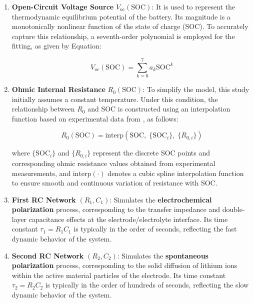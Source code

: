 \begin{enumerate}[label=(\alph*)]
    \item \textbf{Open-Circuit Voltage Source} $V_{\text{oc}}(\text{SOC})$: It is used to represent the thermodynamic equilibrium 
    potential of the battery. Its magnitude is a monotonically nonlinear function of the state of charge (SOC). 
    To accurately capture this relationship, a seventh-order polynomial is employed for the fitting, as given by Equation: 

    \begin{equation}
    V_{oc}(\text{SOC}) = \sum_{k=0}^{7} a_k \text{SOC}^k
    \label{eq:voc}
    \end{equation}
    
    \item \textbf{Ohmic Internal Resistance} $R_0(\text{SOC})$:
    To simplify the model, this study initially assumes a constant temperature.
    Under this condition, the relationship between $R_0$ and SOC is constructed
    using an interpolation function based on experimental data from \cite{Chunling2024},
    as follows:

    \begin{equation}
    R_0(\text{SOC}) = \text{interp}\left(\text{SOC},\; \{\text{SOC}_i\},\; \{R_{0,i}\}\right)
    \label{eq:r0}
    \end{equation}

    where $\{\text{SOC}_i\}$ and $\{R_{0,i}\}$ represent the discrete SOC points and corresponding
    ohmic resistance values obtained from experimental measurements, and $\text{interp}(\cdot)$
    denotes a cubic spline interpolation function to ensure smooth and continuous variation
    of resistance with SOC.

    \item \textbf{First RC Network} $(R_1, C_1)$: Simulates the \textbf{electrochemical polarization} process, 
    corresponding to the transfer impedance and double-layer capacitance effects at the electrode/electrolyte interface. 
    Its time constant $\tau_1 = R_1C_1$ is typically in the order of seconds, reflecting the fast dynamic behavior of the system.
    
    \item \textbf{Second RC Network} $(R_2, C_2)$: Simulates the \textbf{spontaneous polarization} process, 
    corresponding to the solid diffusion of lithium ions within the active material particles of the electrode. 
    Its time constant $\tau_2 = R_2C_2$ is typically in the order of hundreds of seconds, 
    reflecting the slow dynamic behavior of the system.
\end{enumerate}

